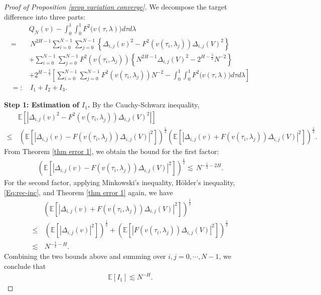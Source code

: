 \documentclass[11pt,reqno]{amsart}
\numberwithin{equation}{section}
\newcommand{\1}{{\bf 1}}
\newcommand{\2}{{\bf 2}}
\begin{document}
   \begin{proof} [Proof of Proposition \ref{prop variation converge}]
We decompose the target difference into three parts:
\begin{equation}
\begin{split}
&Q_{N}(v)-     \int_0^1\int_0^1 F^2\big(v(\tau, \lambda) \big) d\tau d\lambda\\
 =&\, N^{2H-1}\sum_{i=0}^{N-1}\sum_{j=0}^{N-1}\left\{\Delta_{i,j}(v)^2 - F^2(v(\tau_i, \lambda_j)) \Delta_{i,j}(V)^2 \right\}\\
 & +\sum_{i=0}^{N-1}\sum_{j=0}^{N-1} F^2(v(\tau_i, \lambda_j)) \left\{N^{2H-1} \Delta_{i,j}(V)^2   -2^{H-\frac{5}{2}}N^{-2} \right\}\\
  &+2^{H-\frac{5}{2}} \left[\sum_{i=0}^{N-1}\sum_{j=0}^{N-1}  F^2(v(\tau_i, \lambda_j))  N^{-2} -  \int_0^1\int_0^1 F^2\big(v(\tau, \lambda) \big) d\tau d\lambda\right]\\
  =:&\, I_1+I_2+I_3.
 \end{split}
 \end{equation}
 
\noindent\textbf{Step 1:  Estimation of  $I_1$.}
  By  the Cauchy-Schwarz inequality,      
 \begin{align*}
&\mathbb E \left[\left|\Delta_{i,j}(v)^2 - F^2(v(\tau_i, \lambda_j)) \Delta_{i,j}(V)^2\right| \right]\\
\le &\,   \left( \mathbb E \left[\left|\Delta_{i,j}(v)-   F (v(\tau_i, \lambda_j)) \Delta_{i,j}(V)\right|^2 \right]\right)^{\frac12} \left( \mathbb E \left[\left|\Delta_{i,j}(v)+   F (v(\tau_i, \lambda_j)) \Delta_{i,j}(V)\right|^2 \right]\right)^{\frac12} .
 \end{align*}
 From Theorem \ref{thm error 1}, we obtain the bound for the first factor:
  \begin{align*}
  \left( \mathbb E \left[\left|\Delta_{i,j}(v)-   F (v(\tau_i, \lambda_j)) \Delta_{i,j}(V)\right|^2 \right]\right)^{\frac12} 
 \lesssim  \,   N^{-\frac 12-2H}.
 \end{align*}
  For the second factor, applying      Minkowski's inequality,  H\"older's inequality, \eqref{Eq:rec-inc},  and  Theorem \ref{thm error 1} again, we have
  \begin{align*}
&  \left( \mathbb E \left[\left|\Delta_{i,j}(v)+   F (v(\tau_i, \lambda_j)) \Delta_{i,j}(V)\right|^2 \right]\right)^{\frac12}\\
  \le &\, \left( \mathbb E \left[\left|\Delta_{i,j}(v) \right|^2 \right]\right)^{\frac12}+\left( \mathbb E \left[\left|   F (v(\tau_i, \lambda_j)) \Delta_{i,j}(V)\right|^2 \right]\right)^{\frac12} \\
   \lesssim & \,  N^{-\frac12-H}.
  \end{align*}
 Combining the two bounds above and summing over  $i, j=0, \cdots, N-1$, we conclude that 
 \begin{align*}
\mathbb E [I_1] \lesssim  N^{-H}.
  \end{align*} 


\end{proof}
\end{document}
